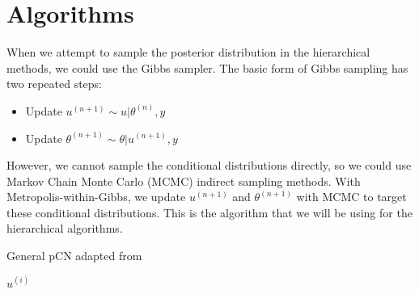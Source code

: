 \documentclass{siamart1116}
\begin{document}
\section{Algorithms}
When we attempt to sample the posterior distribution in the hierarchical methods, we could use the Gibbs sampler. The basic form of Gibbs sampling has two repeated steps:
\begin{itemize}
\item Update $u^{(n+1)} \sim u|\theta^{(n)}, y$
\item Update $\theta^{(n+1)} \sim \theta|u^{(n+1)}, y$
\end{itemize}
However, we cannot sample the conditional distributions directly, so we could use Markov Chain Monte Carlo (MCMC) indirect sampling methods. With Metropolis-within-Gibbs, we update $u^{(n+1)}$ and $\theta^{(n+1)}$ with MCMC to target these conditional distributions. This is the algorithm that we will be using for the hierarchical algorithms.

\begin{algorithm}
\caption{General pCN adapted from \cite{CoRoStWh13}}
\label{alg:generalpCN}
\begin{algorithmic}
\EndFor
\State \Return $u^{(i)}$
\end{algorithmic}
\end{algorithm}
\end{document}

